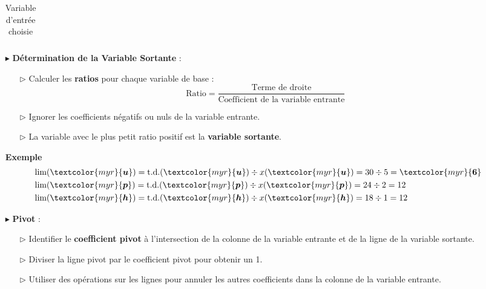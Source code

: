 \documentclass{report}
\begin{document}
\begin{multicols*}{2}
\begin{itemize}
\begin{table}[H]
\begin{center}
\begin{tabular}{|l|l l l l l |l|l|}
                        \end{tabular}
                \end{center}
        \caption{Variable d'entrée choisie}
        \end{table}
    
    \item[$\blacktriangleright$] \textbf{Détermination de la Variable Sortante} :
    \begin{itemize}
        \item[$\rhd$] Calculer les \textbf{ratios} pour chaque variable de base :
        \[
        \boxed{\text{Ratio} = \dfrac{\text{Terme de droite}}{\text{Coefficient de la variable entrante}}}
        \]
        \item[$\rhd$] Ignorer les coefficients négatifs ou nuls de la variable entrante.
        \item[$\rhd$] La variable avec le plus petit ratio positif est la \textbf{variable sortante}.
    \end{itemize}
\noindent
\textbf{Exemple} 
\begin{align*}
    &\text{lim}(\textcolor{myr}{\boldsymbol{u}} ) = 
    \text{t.d.}(\textcolor{myr}{\boldsymbol{u}}) \div 
    x(\textcolor{myr}{\boldsymbol{u}}) = 30 \div 5 = \textcolor{myr}{\boldsymbol{6}}
    \\
    &\text{lim}(\textcolor{myr}{\boldsymbol{p}} ) = 
\text{t.d.}(\textcolor{myr}{\boldsymbol{p}}) \div 
    x(\textcolor{myr}{\boldsymbol{p}}) = 24 \div 2 = 12 
    \\
    &\text{lim}(\textcolor{myr}{\boldsymbol{h}}) = 
\text{t.d.}(\textcolor{myr}{\boldsymbol{h}}) \div 
    x(\textcolor{myr}{\boldsymbol{h}}) = 18 \div 1 = 12 
\end{align*}

    
    \item[$\blacktriangleright$] \textbf{Pivot} :
    \begin{itemize}
        \item[$\rhd$] Identifier le \textbf{coefficient pivot} à l'intersection de la colonne de la variable entrante et de la ligne de la variable sortante.
        \item[$\rhd$] Diviser la ligne pivot par le coefficient pivot pour obtenir un 1.
        \item[$\rhd$] Utiliser des opérations sur les lignes pour annuler les autres coefficients dans la colonne de la variable entrante.
    \end{itemize}



\end{itemize}
\end{multicols*}
\end{document}
